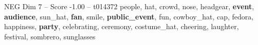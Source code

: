 \begin{textsample}{NEG Dim 7 – Score -1.00 – t014372}  \label{ex:f7_neg_003}
people, hat, crowd, nose, headgear, \textbf{event}, \textbf{audience}, sun\_hat, \textbf{fan}, smile, \textbf{public\_event}, fun, cowboy\_hat, cap, fedora, happiness, \textbf{party}, celebrating, ceremony, costume\_hat, cheering, laughter, festival, sombrero, sunglasses

\end{textsample}
